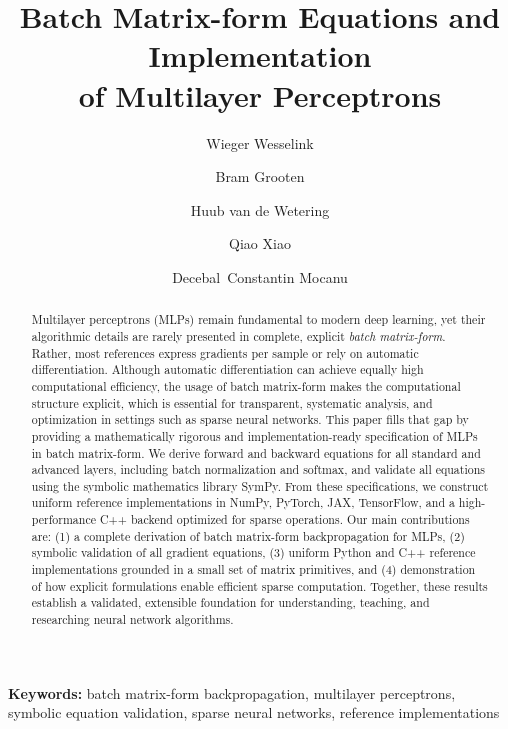 \documentclass[twoside,11pt]{article}
\newcommand{\keywords}[1]{\textbf{Keywords:} #1}
\begin{document}
\title{\centering Batch Matrix-form Equations and Implementation \\ of Multilayer Perceptrons}

\author[1]{Wieger Wesselink}
\author[1]{Bram Grooten}
\author[1]{Huub van de Wetering}
\author[1]{Qiao Xiao}
\author[1,2]{Decebal~Constantin Mocanu}

\affil[ ]{}

\date{}

\maketitle

\begin{abstract}
Multilayer perceptrons (MLPs) remain fundamental to modern deep learning, yet their algorithmic details are rarely presented in complete, explicit \emph{batch matrix-form}. Rather, most references express gradients per sample or rely on automatic differentiation. Although automatic differentiation can achieve equally high computational efficiency, the usage of batch matrix-form makes the computational structure explicit, which is essential for transparent, systematic analysis, and optimization in settings such as sparse neural networks. This paper fills that gap by providing a mathematically rigorous and implementation-ready specification of MLPs in batch matrix-form. We derive forward and backward equations for all standard and advanced layers, including batch normalization and softmax, and validate all equations using the symbolic mathematics library SymPy. From these specifications, we construct uniform reference implementations in NumPy, PyTorch, JAX, TensorFlow, and a high-performance C++ backend optimized for sparse operations.
Our main contributions are:
(1) a complete derivation of batch matrix-form backpropagation for MLPs,
(2) symbolic validation of all gradient equations,
(3) uniform Python and C++ reference implementations grounded in a small set of matrix primitives, and
(4) demonstration of how explicit formulations enable efficient sparse computation.
Together, these results establish a validated, extensible foundation for understanding, teaching, and researching neural network algorithms.
\end{abstract}

\begin{center}
\parbox{0.88\textwidth}{ 
  \keywords{
    batch matrix-form backpropagation, 
    multilayer perceptrons, 
    symbolic equation validation, 
    sparse neural networks, 
    reference implementations
  }
}
\end{center}
\end{document}
